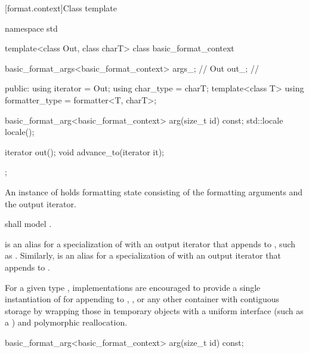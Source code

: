[format.context]{Class template }

%
%
%
%
\begin{codeblock}
namespace std {
  template<class Out, class charT>
  class basic_format_context {
    basic_format_args<basic_format_context> args_;      // \expos
    Out out_;                                           // \expos

  public:
    using iterator = Out;
    using char_type = charT;
    template<class T> using formatter_type = formatter<T, charT>;

    basic_format_arg<basic_format_context> arg(size_t id) const;
    std::locale locale();

    iterator out();
    void advance_to(iterator it);
  };
}
\end{codeblock}

\pnum
An instance of  holds formatting state
consisting of the formatting arguments and the output iterator.

\pnum
{} shall model .

\pnum
{}%
 is an alias for
a specialization of 
with an output iterator
that appends to ,
such as .
%
Similarly,  is an alias for
a specialization of 
with an output iterator
that appends to .

\pnum
\begin{note}
For a given type ,
implementations are encouraged to provide
a single instantiation of 
for appending to
,
,
or any other container with contiguous storage
by wrapping those in temporary objects with a uniform interface
(such as a ) and polymorphic reallocation.
\end{note}

%
\begin{itemdecl}
basic_format_arg<basic_format_context> arg(size_t id) const;
\end{itemdecl}

